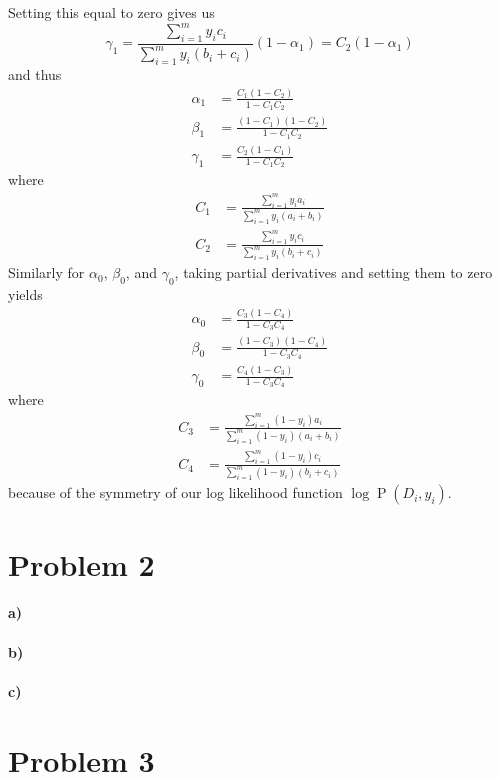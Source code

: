 \documentclass[12pt]{article}
\begin{document}
Setting this equal to zero gives us
\[\gamma_1=\frac{\sum_{i=1}^m y_ic_i}{\sum_{i=1}^m y_i(b_i+c_i)}(1-\alpha_1)=C_2(1-\alpha_1)\]
and thus
\begin{align*}
        \alpha_1&=\frac{C_1(1-C_2)}{1-C_1C_2}\\
        \beta_1&=\frac{(1-C_1)(1-C_2)}{1-C_1C_2}\\
        \gamma_1&=\frac{C_2(1-C_1)}{1-C_1C_2}
\end{align*}
where
\begin{align*}
        C_1&=\frac{\sum_{i=1}^m y_ia_i}{\sum_{i=1}^m y_i(a_i+b_i)}\\
        C_2&=\frac{\sum_{i=1}^m y_ic_i}{\sum_{i=1}^m y_i(b_i+c_i)}
\end{align*}
Similarly for \(\alpha_0\), \(\beta_0\), and \(\gamma_0\), taking partial derivatives and setting them to zero yields
\begin{align*}
        \alpha_0&=\frac{C_3(1-C_4)}{1-C_3C_4}\\
        \beta_0&=\frac{(1-C_3)(1-C_4)}{1-C_3C_4}\\
        \gamma_0&=\frac{C_4(1-C_3)}{1-C_3C_4}
\end{align*}
where
\begin{align*}
        C_3&=\frac{\sum_{i=1}^m (1-y_i)a_i}{\sum_{i=1}^m (1-y_i)(a_i+b_i)}\\
        C_4&=\frac{\sum_{i=1}^m (1-y_i)c_i}{\sum_{i=1}^m (1-y_i)(b_i+c_i)}
\end{align*}
because of the symmetry of our log likelihood function \(\log \operatorname{P}(D_i, y_i)\).

\section*{Problem 2}

\paragraph{a)}

\paragraph{b)}

\paragraph{c)}

\section*{Problem 3}
\end{document}
